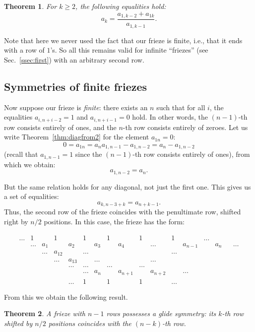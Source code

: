 \documentclass[a4paper,11pt]{amsart}
\theoremstyle{plain}
\newtheorem{theorem}{Theorem}[section]
\theoremstyle{remark}
\theoremstyle{definition}
\numberwithin{equation}{section}
\numberwithin{figure}{section}
\begin{document}
\begin{theorem}\label{thm:2fromdiag}
For $k\geq 2$, the following equalities hold:
\[
a_k=\frac{a_{1,k-2}+a_{1k}}{a_{1,k-1}}.
\]
\end{theorem}

Note that here we never used the fact that our frieze is finite, i.e., that it ends with a row of $1$'s. So all this remains valid for infinite ``friezes'' (see Sec.~\ref{ssec:first}) with an arbitrary second row.


\subsection{Symmetries of finite friezes}

Now suppose our frieze is \emph{finite}: there exists an $n$ such that for all $i$, the equalities $a_{i,n+i-2}=1$ and $a_{i,n+i-1}=0$ hold. In other words, the $(n-1)$-th row consists entirely of ones, and the $n$-th row consists entirely of zeroes. Let us write Theorem~\ref{thm:diagfrom2} for the element $a_{1n}=0$:
\[
0=a_{1n}=a_na_{1,n-1}-a_{1,n-2}=a_n-a_{1,n-2}
\]
(recall that $a_{1,n-1}=1$ since the $(n-1)$-th row consists entirely of ones), from which we obtain:
\[
a_{1,n-2}=a_n.
\]

But the same relation holds for any diagonal, not just the first one. This gives us a set of equalities:
\[
a_{k,n-3+k}=a_{n+k-1}.
\]
Thus, the second row of the frieze coincides with the penultimate row, shifted right by $n/2$ positions. In this case, the frieze has the form:

\begin{equation}\label{eq:frieze}
\begin{array}{ccccccccccccccccccccc}
\dots &1 && 1&& 1&& 1&& 1 &&1&&\dots\\
&\dots & a_1 && a_2  && a_3 &&a_4&& \dots&&  a_{n-1}&&a_n&&\dots\\
&&\dots & a_{12} &&\dots &&&&&& \dots \\
&&&\dots & a_{13} &&\dots&&&& \dots \\
&&&&\dots & \dots &&\dots &&\dots\\
&&&&&\dots & a_{n} && a_{n+1}&&a_{n+2}&&\dots \\
&&&&\dots & 1 && 1&& 1 && \dots 
\end{array}
\end{equation}

From this we obtain the following result.

\begin{theorem}
A frieze with $n-1$ rows possesses a glide symmetry: its $k$-th row shifted by $n/2$ positions coincides with the $(n-k)$-th row.
\end{theorem}
\end{document}

